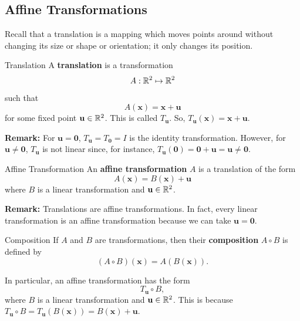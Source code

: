 \documentclass[letterpaper]{article}
\begin{document}
\subsection{Affine Transformations}
Recall that a translation is a mapping which moves points around without changing its size or shape or orientation; it only changes its position. 

\begin{definition}{Translation}{}
    A \textbf{translation} is a transformation
    \[A: \mathbb{R}^2 \mapsto \mathbb{R}^2\]
    such that
    \[A(\mathbf{x}) = \mathbf{x} + \mathbf{u}\]
    for some fixed point $\mathbf{u} \in \mathbb{R}^2$. This is called $T_{\mathbf{u}}$. So, $T_{\mathbf{u}}(\mathbf{x}) = \mathbf{x} + \mathbf{u}$.  
\end{definition}
\textbf{Remark:} For $\mathbf{u} = \mathbf{0}$, $T_{\mathbf{u}} = T_{\mathbf{0}} = I$ is the identity transformation. However, for $\mathbf{u} \neq \mathbf{0}$, $T_{\mathbf{u}}$ is not linear since, for instance, $T_{\mathbf{u}}(\mathbf{0}) = \mathbf{0} + \mathbf{u} = \mathbf{u} \neq \mathbf{0}$. 

\begin{definition}{Affine Transformation}{}
    An \textbf{affine transformation} $A$ is a translation of the form 
    \[A(\mathbf{x}) = B(\mathbf{x}) + \mathbf{u}\]
    where $B$ is a linear transformation and $\mathbf{u} \in \mathbb{R}^2$. 
\end{definition}
\textbf{Remark:} Translations are affine transformations. In fact, every linear transformation is an affine transformation because we can take $\mathbf{u} = \mathbf{0}$. 

\begin{definition}{Composition}{}
    If $A$ and $B$ are transformations, then their \textbf{composition} $A \circ B$ is defined by 
    \[(A \circ B)(\mathbf{x}) = A(B(\mathbf{x})).\]
\end{definition}
In particular, an affine transformation has the form 
\[T_{\mathbf{u}} \circ B,\]
where $B$ is a linear transformation and $\mathbf{u} \in \mathbb{R}^2$. This is because $T_{\mathbf{u}} \circ B = T_{\mathbf{u}}(B(\mathbf{x})) = B(\mathbf{x}) + \mathbf{u}$. 
\end{document}
